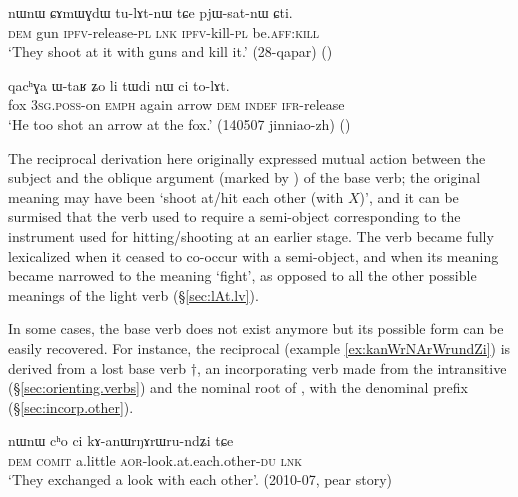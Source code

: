 \begin{exe}
\ex \label{ex:CAmWGdW.tulAtnW}
\gll nɯnɯ ɕɤmɯɣdɯ tu-lɤt-nɯ tɕe pjɯ-sat-nɯ ɕti. \\
\textsc{dem} gun \textsc{ipfv}-release-\textsc{pl} \textsc{lnk} \textsc{ipfv}-kill-\textsc{pl} be.\textsc{aff}:\textsc{kill} \\
\glt `They shoot at it with guns and kill it.' (28-qapar)
()
\end{exe}

\begin{exe}
\ex \label{ex:qachGa.WtaR.tWdi.tolAt}
\gll qacʰɣa ɯ-taʁ ʑo li tɯdi nɯ ci to-lɤt. \\
fox \textsc{3sg}.\textsc{poss}-on \textsc{emph} again arrow \textsc{dem} \textsc{indef} \textsc{ifr}-release \\
\glt `He too shot an arrow at the fox.' (140507 jinniao-zh)
()
\end{exe}

The reciprocal derivation here originally expressed mutual action between the subject and the oblique argument (marked by ) of the base verb; the original meaning may have been `shoot at/hit each other (with $X$)', and it can be surmised that the verb  used to require a semi-object corresponding to the instrument used for hitting/shooting at an earlier stage. The verb  became fully lexicalized when it ceased to co-occur with a semi-object, and when its meaning became narrowed to the meaning `fight', as opposed to all the other possible meanings of the light verb  (§\ref{sec:lAt.lv}).
 
In some cases, the base verb does not exist anymore but its possible form can be easily recovered. For instance, the reciprocal  (example \ref{ex:kanWrNArWrundZi}) is derived from a lost base verb $\dagger$, an incorporating verb made from the intransitive  (§\ref{sec:orienting.verbs})  and the nominal root of , with the denominal prefix  (§\ref{sec:incorp.other}).

\begin{exe}
\ex \label{ex:kanWrNArWrundZi}
\gll   nɯnɯ cʰo ci kɤ-anɯrŋɤrɯru-ndʑi tɕe \\
\textsc{dem} \textsc{comit} a.little \textsc{aor}-look.at.each.other-\textsc{du} \textsc{lnk} \\
\glt  `They exchanged a look with each other'. (2010-07, pear story)
\end{exe}

